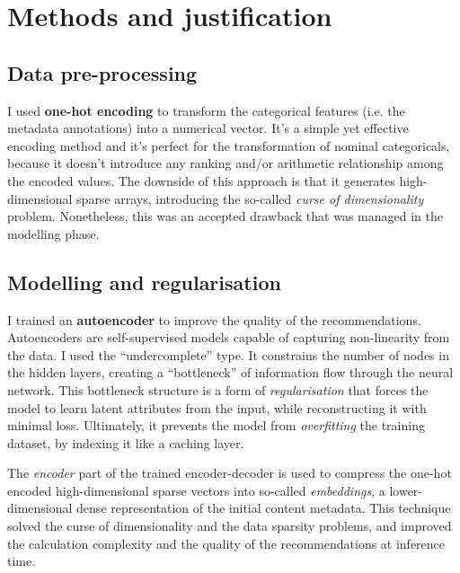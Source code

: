 
\section{Methods and justification}

\subsection{Data pre-processing}

I used \textbf{one-hot encoding} to transform the categorical features (i.e. the metadata annotations) into a numerical vector.
It's a simple yet effective encoding method and it's perfect for the transformation of nominal categoricals,
because it doesn't introduce any ranking and/or arithmetic relationship among the
encoded values. The downside of this approach is that it generates high-dimensional sparse arrays,
introducing the so-called \textit{curse of dimensionality} problem. Nonetheless, this was an accepted drawback that was
managed in the modelling phase.

\subsection{Modelling and regularisation}

I trained an \textbf{autoencoder} \cite{DBLP:journals/corr/abs-2003-05991,DBLP:journals/corr/abs-2201-03898} to improve the quality of the recommendations.
Autoencoders are self-supervised models capable of capturing non-linearity from the data. I used the ``undercomplete'' type.
It constrains the number of nodes in the hidden layers, creating a ``bottleneck'' of information flow through the neural network.
This bottleneck structure is a form of \textit{regularisation} that forces the model to learn latent attributes from the input,
while reconstructing it with minimal loss. Ultimately, it prevents the model from \textit{overfitting} the training dataset,
by indexing it like a caching layer.

The \textit{encoder} part of the trained encoder-decoder is used to compress the one-hot encoded high-dimensional sparse vectors into
so-called \textit{embeddings}, a lower-dimensional dense representation of the initial content metadata.
This technique solved the curse of dimensionality and the data sparsity problems, and improved the calculation complexity and the quality
of the recommendations at inference time.


